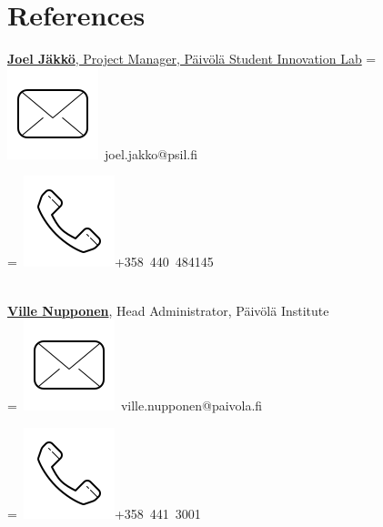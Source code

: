 \documentclass[]{plushcv}
\begin{document}
\begin{minipage}[t]{0.25\textwidth}

\section{References} 
\href{https://www.linkedin.com/in/joel-jakko/}{\textbf{Joel Jäkkö}, Project Manager, Päivölä Student Innovation Lab}
\begingroup
{}=\hbox{
\includegraphics[scale=0.1,trim={0 1cm 0cm 0cm}]{icons/main/mail.png}\hspace{0.3cm} joel.jakko@psil.fi
}
\parbox{\wd0}{}
\endgroup
\begingroup
{}=\hbox{
\includegraphics[scale=0.1,trim={0 1.25cm -0.4cm 0cm}]{icons/main/phone.png}\hspace{0.3cm}+358 440 484145
}
\parbox{\wd0}{}\endgroup
\\
\sectionsep
\href{https://github.com/aikain}{\textbf{Ville Nupponen}}, Head Administrator, Päivölä Institute 
\\
\begingroup
{}=\hbox{
\includegraphics[scale=0.1,trim={0 1cm 0cm 0cm}]{icons/main/mail.png}\hspace{0.3cm} ville.nupponen@paivola.fi
}
\parbox{\wd0}{}
\endgroup
\begingroup
{}=\hbox{
\includegraphics[scale=0.1,trim={0 1.25cm -0.4cm 0cm}]{icons/main/phone.png}\hspace{0.3cm}+358 441 3001
}
\end{minipage}
\end{document}
